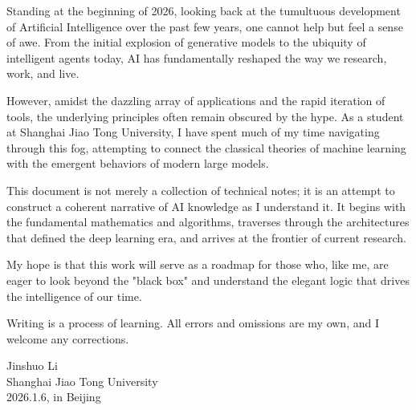 \preface
\thispagestyle{empty}

Standing at the beginning of 2026, looking back at the tumultuous development of Artificial Intelligence over the past few years, one cannot help but feel a sense of awe. From the initial explosion of generative models to the ubiquity of intelligent agents today, AI has fundamentally reshaped the way we research, work, and live.

However, amidst the dazzling array of applications and the rapid iteration of tools, the underlying principles often remain obscured by the hype. As a student at Shanghai Jiao Tong University, I have spent much of my time navigating through this fog, attempting to connect the classical theories of machine learning with the emergent behaviors of modern large models.

This document is not merely a collection of technical notes; it is an attempt to construct a coherent narrative of AI knowledge as I understand it. It begins with the fundamental mathematics and algorithms, traverses through the architectures that defined the deep learning era, and arrives at the frontier of current research.

My hope is that this work will serve as a roadmap for those who, like me, are eager to look beyond the "black box" and understand the elegant logic that drives the intelligence of our time.

Writing is a process of learning. All errors and omissions are my own, and I welcome any corrections.

\begin{flushright}
Jinshuo Li \\
Shanghai Jiao Tong University \\
2026.1.6, in Beijing
\end{flushright}

\cleardoublepage
{}
\setcounter{page}{1}